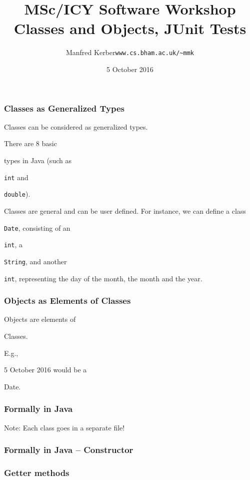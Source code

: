 \documentclass{beamer}
\def\mytoday{5 October 2016}
\def\mcolor#1#2{\rule{0ex}{0ex}\color{#1}#2\color{black}{}}
\begin{document}
\title{MSc/ICY Software Workshop\\
Classes and Objects, JUnit Tests}

\author[Manfred~Kerber]{\begin{tabular}{ll}
\mcolor{blue}{Manfred Kerber} &   {\tt www.cs.bham.ac.uk/\~{}mmk}\\
\end{tabular}}

\date{\mytoday}

\begin{frame}
\titlepage


\end{frame}

\begin{frame}
\frametitle{Classes as Generalized Types}
\mcolor{red}{Classes} can be considered as generalized types.\bigskip

There are 8 basic \mcolor{blue}{types} in Java (such as
\mcolor{blue}{\texttt{int}} and \mcolor{blue}{\texttt{double}}).\bigskip

Classes are general and can be user defined. For instance, we can
define a class \mcolor{blue}{\texttt{Date}}, consisting of an
\mcolor{blue}{\texttt{int}}, a \mcolor{blue}{\texttt{String}}, and
another \mcolor{blue}{\texttt{int}}, representing the day of the
month, the month and the year.
\end{frame}

\begin{frame}
\frametitle{Objects as Elements of Classes}

\mcolor{red}{Objects} are elements of \mcolor{blue}{Classes}.\bigskip

E.g., \mcolor{blue}{\mytoday} would be a \mcolor{blue}{Date}.\bigskip

\end{frame}

\begin{frame}
\frametitle{Formally in Java}


\mcolor{red}{Note: Each class goes in a separate file!}
\end{frame}

\begin{frame}
\frametitle{Formally in Java -- Constructor}

\end{frame}

\begin{frame}
\frametitle{Getter methods}\vspace{-1ex}
\renewcommand{\baselinestretch}{0.6}\small\normalsize

\end{frame}
\end{document}

